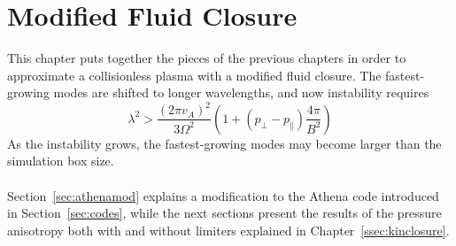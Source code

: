 \chapter{Modified Fluid Closure}\label{chap:kinbrag}
This chapter puts together the pieces of the previous chapters in order to approximate a collisionless plasma with a modified fluid closure. The fastest-growing modes are shifted to longer wavelengths, and now instability requires
\begin{equation}
  \lambda^2>\frac{(2\pi v_A)^2}{3\Omega^2}\left(1+(p_\perp-p_\parallel)\frac{4\pi}{B^2}\right)
\end{equation}
As the instability grows, the fastest-growing modes may become larger than the simulation box size. \\
\\
Section~\ref{sec:athenamod} explains a modification to the Athena code introduced in Section~\ref{sec:codes}, while the next sections present the results of the pressure anisotropy both with and without limiters explained in Chapter~\ref{ssec:kinclosure}.

